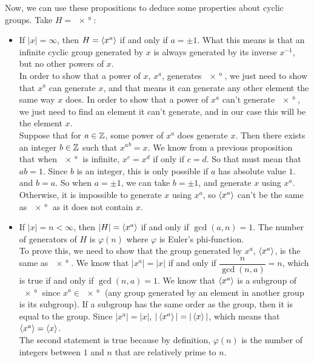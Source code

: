\documentclass[12pt]{article}
\begin{document}
    Now, we can use these propositions to deduce some properties
    about cyclic groups.
    Take $H = \ang{x}$:
    \begin{itemize}[label=$\diamond$]
        \item 
            If $|x| = \infty$,
            then $H = \left\langle x^a \right\rangle$ if and only if $a = \pm 1$.
            What this means is that an infinite cyclic group
            generated by $x$
            is always generated by its inverse $x^{-1}$,
            but no other powers of $x$. \\
            In order to show that a power of $x$, $x^a$,
            generates $\ang{x}$,
            we just need to show that $x^a$ can generate $x$,
            and that means it can generate any other element
            the same way $x$ does.
            In order to show that a power of $x^a$
            can't generate $\ang{x}$,
            we just need to find an element it can't generate,
            and in our case this will be the element $x$. \\
            Suppose that for $a \in \mathbb{Z}$,
            some power of $x^a$ does generate $x$.
            Then there exists an integer $b \in \mathbb{Z}$
            such that ${x^a}^b = x$.
            We know from a previous proposition that when $\ang{x}$
            is infinite, $x^{c} = x^d$ if only if $c = d$.
            So that must mean that $ab = 1$.
            Since $b$ is an integer,
            this is only possible if $a$ has absolute value $1$.
            and $b = a$.
            So when $a = \pm 1$, we can take $b = \pm 1$,
            and generate $x$ using $x^a$.
            Otherwise, it is impossible to generate $x$ using $x^a$,
            so $\left\langle x^a \right\rangle$ can't be the same as $\ang{x}$
            as it does not contain $x$.
        \item
            If $|x| = n < \infty$, then $|H| = \left\langle x^a \right\rangle$
            if and only if $\gcd(a, n) = 1$.
            The number of generators of $H$ is $\varphi(n)$
            where $\varphi$ is Euler's phi-function. \\
            To prove this, we need to show that the group
            generated by $x^a$, $\left\langle x^a \right\rangle$,
            is the same as $\ang{x}$.
            We know that $|x^a| = |x|$
            if and only if $\dfrac{n}{\gcd(n, a)} = n$,
            which is true if and only if $\gcd(n, a) = 1$.
            We know that $\left\langle x^a \right\rangle$ is a subgroup of $\ang{x}$
            since $x^a \in \ang{x}$
            (any group generated by an element in another group
            is its subgroup).
            If a subgroup has the same order as the group,
            then it is equal to the group.
            Since $|x^a| = |x|$, $|\left\langle x^a \right\rangle| = |\left\langle x \right\rangle|$,
            which means that $\left\langle x^a \right\rangle = \left\langle x \right\rangle$. \\
            The second statement is true because by definition,
            $\varphi(n)$ is the number of integers
            between $1$ and $n$ that are relatively prime to $n$.
    \end{itemize}
\end{document}
